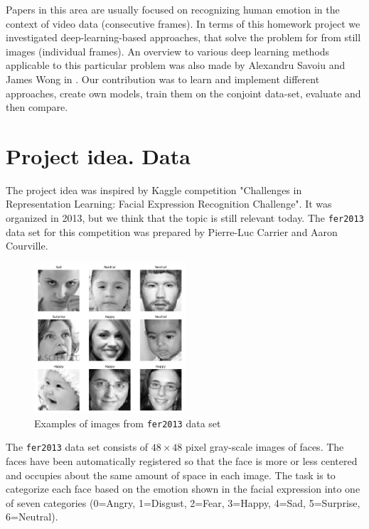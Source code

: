 Papers in this area are usually focused on recognizing human emotion in the context of video data (consecutive frames)\cite{video1}. In terms of this homework project we investigated deep-learning-based approaches, that solve the problem for from still images (individual frames). An overview to various deep learning methods applicable to this particular problem was also made by Alexandru Savoiu and James Wong in \cite{deepNN}. Our contribution was to learn and implement different approaches, create own models, train them on the conjoint data-set, evaluate and then compare.

\section{Project idea. Data}

The project idea was inspired by Kaggle competition "Challenges in Representation Learning: Facial Expression Recognition Challenge". It was organized in 2013, but we think that the topic is still relevant today. The \texttt{fer2013} data set \cite{dataset} for this competition was prepared by Pierre-Luc Carrier and Aaron Courville.\\

\begin{figure}
	\centering
	\includegraphics[width=0.5\textwidth]{../images/examples.png}
	\caption{Examples of images from \texttt{fer2013} data set}
	\label{fig:faces}
\end{figure}

The \texttt{fer2013} data set consists of $48\times48$ pixel gray-scale images of faces. The faces have been automatically registered so that the face is more or less centered and occupies about the same amount of space in each image. The task is to categorize each face based on the emotion shown in the facial expression into one of seven categories (0=Angry, 1=Disgust, 2=Fear, 3=Happy, 4=Sad, 5=Surprise, 6=Neutral).\\

